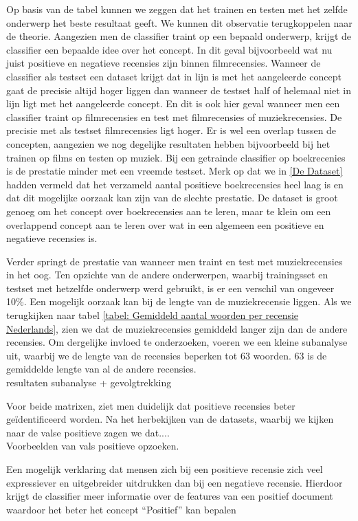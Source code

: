 Op basis van de tabel kunnen we zeggen dat het trainen en testen met het zelfde onderwerp het beste resultaat geeft. We kunnen dit observatie terugkoppelen naar de theorie. Aangezien men de classifier traint op een bepaald onderwerp, krijgt de classifier een bepaalde idee over het concept. In dit geval bijvoorbeeld wat nu juist positieve en negatieve recensies zijn binnen filmrecensies. Wanneer de classifier als testset een dataset krijgt dat in lijn is met het aangeleerde concept gaat de precisie altijd hoger liggen dan wanneer de testset half of helemaal niet in lijn ligt met het aangeleerde concept. En dit is ook hier geval wanneer men een classifier traint op filmrecensies en test met filmrecensies of muziekrecensies. De precisie met als testset filmrecensies ligt hoger. Er is wel een overlap tussen de concepten, aangezien we nog degelijke resultaten hebben bijvoorbeeld bij het trainen op films en testen op muziek. Bij een getrainde classifier op boekrecenies is de prestatie minder met een vreemde testset. Merk op dat we in \ref{De Dataset} hadden vermeld dat het verzameld aantal positieve boekrecensies heel laag is  en dat dit mogelijke oorzaak kan zijn van de slechte prestatie. De dataset is groot genoeg om het concept over boekrecensies aan te leren, maar te klein om een overlappend concept aan te leren over wat in een algemeen een positieve en negatieve recensies is.

Verder springt de prestatie van wanneer men traint en test met muziekrecensies in het oog. Ten opzichte van de andere onderwerpen, waarbij trainingsset en testset met hetzelfde onderwerp werd gebruikt, is er een verschil van ongeveer 10\%. Een mogelijk oorzaak kan bij de lengte van de muziekrecensie liggen. Als we terugkijken naar tabel \ref{tabel: Gemiddeld aantal woorden per recensie Nederlands}, zien we dat de muziekrecensies gemiddeld langer zijn dan de andere recensies. Om dergelijke invloed te onderzoeken, voeren we een kleine subanalyse uit, waarbij we de lengte van de recensies beperken tot 63 woorden. 63 is de gemiddelde lengte van al de andere recensies. \\

resultaten subanalyse + gevolgtrekking

Voor beide matrixen, ziet men duidelijk dat positieve recensies beter ge\"identificeerd worden. Na het herbekijken van de datasets, waarbij we kijken naar de valse positieve zagen we dat....\\

Voorbeelden van vals positieve opzoeken.

Een mogelijk verklaring dat mensen zich bij een positieve recensie zich veel expressiever en uitgebreider uitdrukken dan bij een negatieve recensie. Hierdoor krijgt de classifier meer informatie over de features van een positief document waardoor het beter het concept ``Positief'' kan bepalen 


